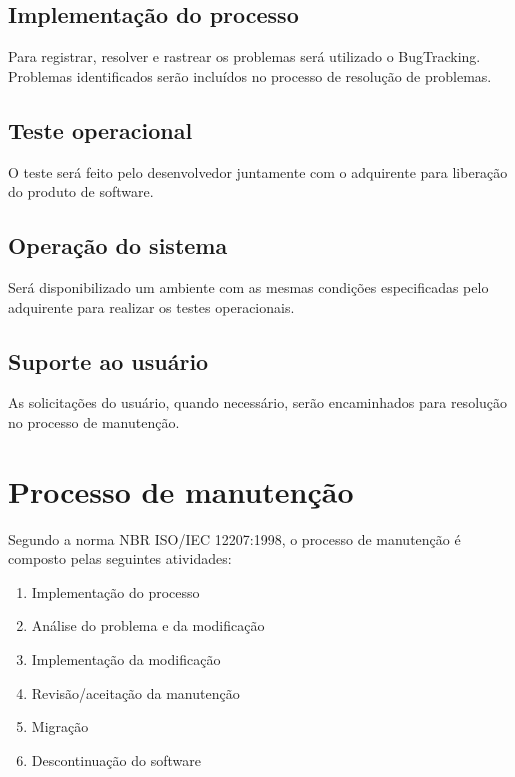 \subsection{Implementação do processo}

Para registrar, resolver e rastrear os problemas será utilizado o BugTracking. Problemas identificados serão incluídos no processo de resolução de problemas.%

\subsection{Teste operacional}

O teste será feito pelo desenvolvedor juntamente com o adquirente para liberação do produto de software.

\subsection{Operação do sistema}

Será disponibilizado um ambiente com as mesmas condições especificadas pelo adquirente para realizar os testes operacionais.

\subsection{Suporte ao usuário}

As solicitações do usuário, quando necessário, serão encaminhados para resolução no processo de manutenção.

\section{Processo de manutenção}
\label{sec:manutencao}

Segundo a norma NBR ISO/IEC 12207:1998, o processo de manutenção é composto pelas seguintes atividades:

\begin{enumerate}
  \item Implementação do processo
  \item Análise do problema e da modificação
  \item Implementação da modificação
  \item Revisão/aceitação da manutenção
  \item Migração
  \item Descontinuação do software
\end{enumerate}

